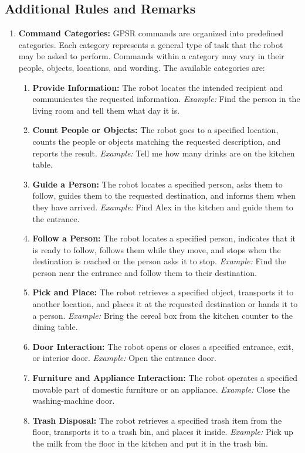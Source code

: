 \subsection*{Additional Rules and Remarks}
\begin{enumerate}[nosep]
	\item \textbf{Command Categories:} GPSR commands are organized into predefined categories. Each category represents a general type of task that the robot may be asked to perform. Commands within a category may vary in their people, objects, locations, and wording. The available categories are:
	\begin{enumerate}[nosep,label=\arabic*)]
		\item \textbf{Provide Information:} The robot locates the intended recipient and communicates the requested information. \textit{Example:} Find the person in the living room and tell them what day it is.
		\item \textbf{Count People or Objects:} The robot goes to a specified location, counts the people or objects matching the requested description, and reports the result. \textit{Example:} Tell me how many drinks are on the kitchen table.
		\item \textbf{Guide a Person:} The robot locates a specified person, asks them to follow, guides them to the requested destination, and informs them when they have arrived. \textit{Example:} Find Alex in the kitchen and guide them to the entrance.
		\item \textbf{Follow a Person:} The robot locates a specified person, indicates that it is ready to follow, follows them while they move, and stops when the destination is reached or the person asks it to stop. \textit{Example:} Find the person near the entrance and follow them to their destination.
		\item \textbf{Pick and Place:} The robot retrieves a specified object, transports it to another location, and places it at the requested destination or hands it to a person. \textit{Example:} Bring the cereal box from the kitchen counter to the dining table.
		\item \textbf{Door Interaction:} The robot opens or closes a specified entrance, exit, or interior door. \textit{Example:} Open the entrance door.
		\item \textbf{Furniture and Appliance Interaction:} The robot operates a specified movable part of domestic furniture or an appliance. \textit{Example:} Close the washing-machine door.
		\item \textbf{Trash Disposal:} The robot retrieves a specified trash item from the floor, transports it to a trash bin, and places it inside. \textit{Example:} Pick up the milk from the floor in the kitchen and put it in the trash bin.

\end{enumerate}
\end{enumerate}
